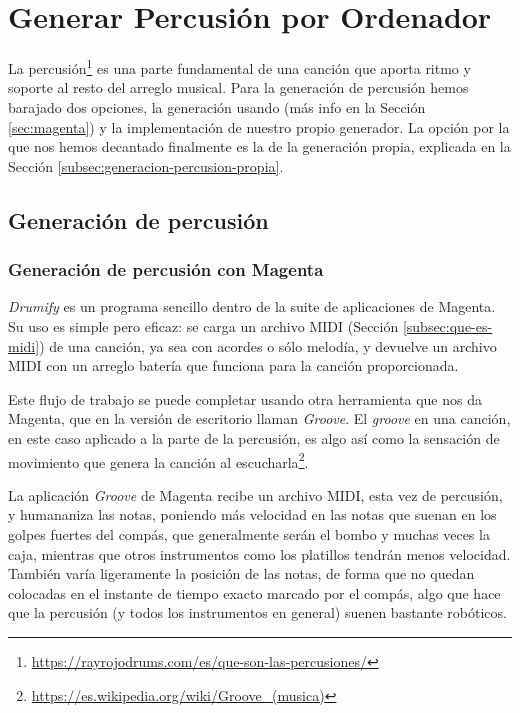 \chapter{Generar Percusión por Ordenador}
\label{cap:generacionPercusion}

La percusión\footnote{\url{https://rayrojodrums.com/es/que-son-las-percusiones/}} es una parte fundamental de una canción que aporta ritmo y soporte al resto del arreglo musical. Para la generación de percusión hemos barajado dos opciones, la generación usando \cite{MagentaStudio}(más info en la Sección \ref{sec:magenta}) y la implementación de nuestro propio generador. La opción por la que nos hemos decantado finalmente es la de la generación propia, explicada en la Sección \ref{subsec:generacion-percusion-propia}.


\section{Generación de percusión}
\label{sec:generacion-percusion}

    \subsection{Generación de percusión con Magenta}
    \label{subsec:generacion-percusion-magenta}
    \textit{Drumify} es un programa sencillo dentro de la suite de aplicaciones de Magenta. Su uso es simple pero eficaz: se carga un archivo MIDI (Sección \ref{subsec:que-es-midi}) de una canción, ya sea con acordes o sólo melodía, y devuelve un archivo MIDI con un arreglo batería que funciona para la canción proporcionada. 
    
    Este flujo de trabajo se puede completar usando otra herramienta que nos da Magenta, que en la versión de escritorio llaman \textit{Groove}.
    El \textit{groove} en una canción, en este caso aplicado a la parte de la percusión, es algo así como la sensación de movimiento que genera la canción al escucharla\footnote{\url{https://es.wikipedia.org/wiki/Groove_(musica)}}.
    
    La aplicación \textit{Groove} de Magenta recibe un archivo MIDI, esta vez de percusión, y humananiza las notas, poniendo más velocidad en las notas que suenan en los golpes fuertes del compás, que generalmente serán el bombo y muchas veces la caja, mientras que otros instrumentos como los platillos tendrán menos velocidad. También varía ligeramente la posición de las notas, de forma que no quedan colocadas en el instante de tiempo exacto marcado por el compás, algo que hace que la percusión (y todos los instrumentos en general) suenen bastante robóticos.

